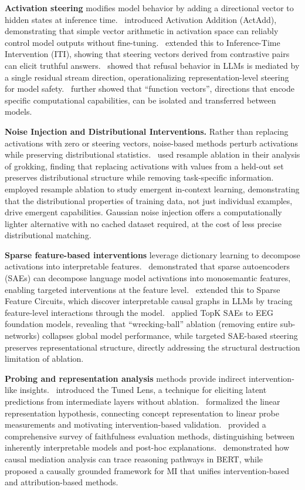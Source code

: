 \documentclass[pdflatex,sn-mathphys-num]{sn-jnl}
\begin{document}
\textbf{Activation steering} modifies model behavior by adding a directional vector to hidden states at inference time.~\cite{Turner2023} introduced Activation Addition (ActAdd), demonstrating that simple vector arithmetic in activation space can reliably control model outputs without fine-tuning.~\cite{Li2024} extended this to Inference-Time Intervention (ITI), showing that steering vectors derived from contrastive pairs can elicit truthful answers.~\cite{Arditi2024} showed that refusal behavior in LLMs is mediated by a single residual stream direction, operationalizing representation-level steering for model safety.~\cite{Todd2024} further showed that ``function vectors'', directions that encode specific computational capabilities, can be isolated and transferred between models.

\textbf{Noise Injection and Distributional Interventions.} Rather than replacing activations with zero or steering vectors, noise-based methods perturb activations while preserving distributional statistics.~\cite{Nanda2023} used resample ablation in their analysis of grokking, finding that replacing activations with values from a held-out set preserves distributional structure while removing task-specific information.~\cite{Chan2022} employed resample ablation to study emergent in-context learning, demonstrating that the distributional properties of training data, not just individual examples, drive emergent capabilities. Gaussian noise injection offers a computationally lighter alternative with no cached dataset required, at the cost of less precise distributional matching.

\textbf{Sparse feature-based interventions} leverage dictionary learning to decompose activations into interpretable features.~\cite{Bricken2023} demonstrated that sparse autoencoders (SAEs) can decompose language model activations into monosemantic features, enabling targeted interventions at the feature level.~\cite{Marks2024} extended this to Sparse Feature Circuits, which discover interpretable causal graphs in LLMs by tracing feature-level interactions through the model.~\cite{LehnSchioler2026} applied TopK SAEs to EEG foundation models, revealing that ``wrecking-ball'' ablation (removing entire sub-networks) collapses global model performance, while targeted SAE-based steering preserves representational structure, directly addressing the structural destruction limitation of ablation.

\textbf{Probing and representation analysis} methods provide indirect intervention-like insights.~\cite{Belrose2023} introduced the Tuned Lens, a technique for eliciting latent predictions from intermediate layers without ablation.~\cite{ParkChoe2023} formalized the linear representation hypothesis, connecting concept representation to linear probe measurements and motivating intervention-based validation.~\cite{Lyu2023} provided a comprehensive survey of faithfulness evaluation methods, distinguishing between inherently interpretable models and post-hoc explanations.~\cite{DeCao2021} demonstrated how causal mediation analysis can trace reasoning pathways in BERT, while~\cite{Mahale2026} proposed a causally grounded framework for MI that unifies intervention-based and attribution-based methods.
\end{document}
